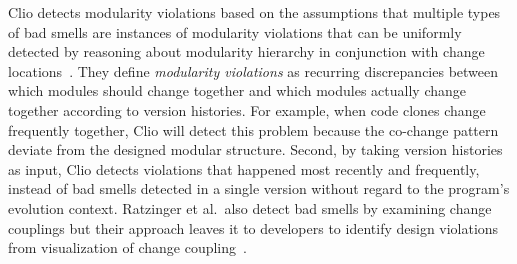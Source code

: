 Clio detects modularity violations based on the assumptions that multiple types of bad smells are instances of modularity violations that can be uniformly detected by reasoning about modularity hierarchy in conjunction with change locations~\cite{Wong2011:cleo}. They define {\em modularity violations} as recurring discrepancies between which modules should change together and which modules actually change together according to version histories. For example, when code clones change frequently together, Clio will detect this problem because the co-change pattern deviate from the designed modular structure. Second, by taking version histories as input, Clio detects violations that happened most recently and frequently, instead of bad smells detected in a single version without regard to the program's evolution context. Ratzinger et al.~also detect bad smells by examining change couplings but their approach leaves it to developers to identify design violations from visualization of change coupling~\cite{ratzinger:msr05}. 


